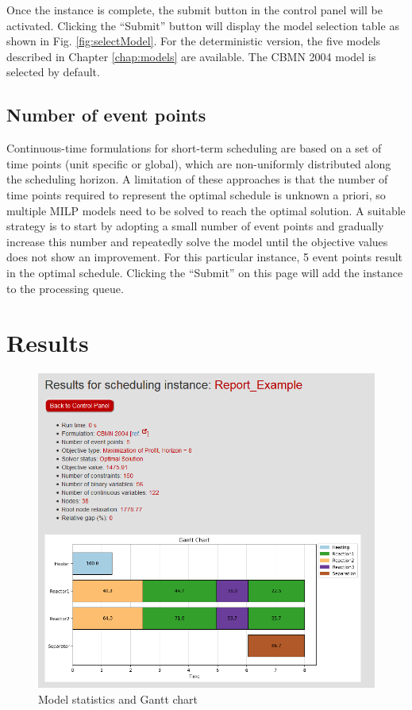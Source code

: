 Once the instance is complete, the submit button in the control panel will be activated. Clicking the ``Submit'' button will display the model selection table as shown in Fig. \ref{fig:selectModel}. For the deterministic version, the five models described in Chapter \ref{chap:models} are available. The CBMN 2004 model is selected by default. 

\subsection{Number of event points}

Continuous-time formulations for short-term scheduling are based on a set of time points (unit specific or global), which are non-uniformly distributed along the scheduling horizon. A limitation of these approaches is that the number of time points required to represent the optimal schedule is unknown a priori, so multiple MILP models need to be solved to reach the optimal solution. A suitable strategy is to start by adopting a small number of event points and gradually increase this number and repeatedly solve the model until the objective values does not show an improvement. For this particular instance, 5 event points result in the optimal schedule. Clicking the ``Submit'' on this page will add the instance to the processing queue.

\section{Results}
\begin{figure}[htbp]
\centering
\includegraphics[width=\linewidth]{Images/Results.png}
\caption{Model statistics and Gantt chart}
\label{fig:results}
\end{figure}

